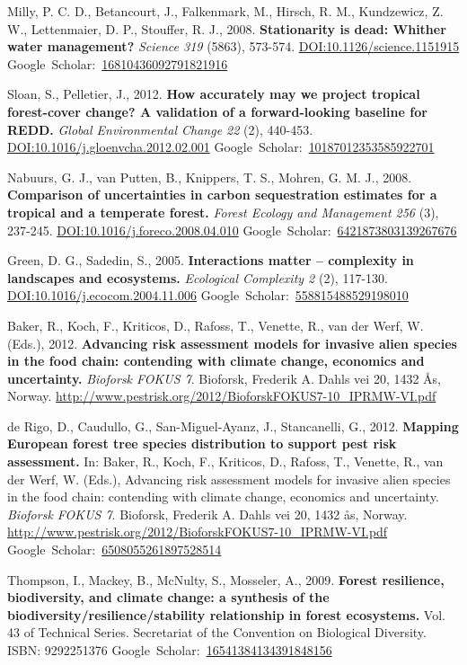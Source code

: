 \documentclass[a4paper,11pt]{article}
\newcommand{\gourl}[1]{\url{#1}}
\newcommand{\goDOI}[1]{\href{http://dx.doi.org/#1}{DOI:#1}}
\newcommand{\goScholar}[1]{{Google~Scholar}:~\href{http://scholar.google.com/scholar?cluster=#1}{#1}}
\begin{document}
\begin{footnotesize}
{\begin{thebibliography}{}
 Milly, P. C. D., Betancourt, J., Falkenmark, M., Hirsch, R. M., Kundzewicz, Z. W., Lettenmaier, D. P., Stouffer, R. J., 2008. \textbf{Stationarity is dead: Whither water management?} \emph{Science 319} (5863), 573-574. \goDOI{10.1126/science.1151915} \goScholar{16810436092791821916}

 Sloan, S., Pelletier, J., 2012. \textbf{How accurately may we project tropical forest-cover change? A validation of a forward-looking baseline for REDD.} \emph{Global Environmental Change 22} (2), 440-453. \goDOI{10.1016/j.gloenvcha.2012.02.001} \goScholar{10187012353585922701}

 Nabuurs, G. J., van Putten, B., Knippers, T. S., Mohren, G. M. J., 2008. \textbf{Comparison of uncertainties in carbon sequestration estimates for a tropical and a temperate forest.} \emph{Forest Ecology and Management 256} (3), 237-245. \goDOI{10.1016/j.foreco.2008.04.010} \goScholar{6421873803139267676}

 Green, D. G., Sadedin, S., 2005. \textbf{Interactions matter -- complexity in landscapes and ecosystems.} \emph{Ecological Complexity 2} (2), 117-130. \goDOI{10.1016/j.ecocom.2004.11.006} \goScholar{558815488529198010}


 Baker, R., Koch, F., Kriticos, D., Rafoss, T., Venette, R., van der Werf, W. (Eds.), 2012. \textbf{Advancing risk assessment models for invasive alien species in the food chain: contending with climate change, economics and uncertainty.} \emph{Bioforsk FOKUS 7}. Bioforsk, Frederik A. Dahls vei 20, 1432 \r{A}s, Norway. \gourl {http://www.pestrisk.org/2012/BioforskFOKUS7-10\_IPRMW-VI.pdf}

 de Rigo, D., Caudullo, G., San-Miguel-Ayanz, J., Stancanelli, G., 2012. \textbf{Mapping European forest tree species distribution to support pest risk assessment.} In: Baker, R., Koch, F., Kriticos, D., Rafoss, T., Venette, R., van der Werf, W. (Eds.), Advancing risk assessment models for invasive alien species in the food chain: contending with climate change, economics and uncertainty. \emph{Bioforsk FOKUS 7}. Bioforsk, Frederik A. Dahls vei 20, 1432 \r{a}s, Norway. \gourl {http://www.pestrisk.org/2012/BioforskFOKUS7-10\_IPRMW-VI.pdf} \goScholar{6508055261897528514}

 Thompson, I., Mackey, B., McNulty, S., Mosseler, A., 2009. \textbf{Forest resilience, biodiversity, and climate change: a synthesis of the biodiversity/resilience/stability relationship in forest ecosystems.} Vol. 43 of Technical Series. Secretariat of the Convention on Biological Diversity. ISBN: 9292251376 \goScholar{16541384134391848156}


\end{thebibliography}}
\end{footnotesize}
\end{document}
